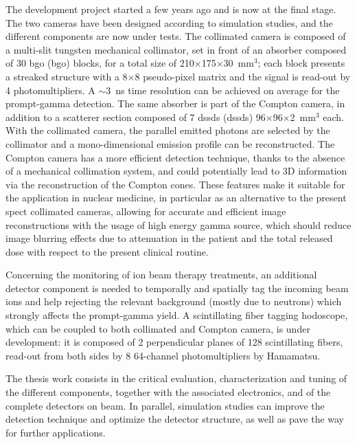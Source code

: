 The development project started a few years ago and is now at the final stage. The two cameras have been designed according to simulation studies, and the different components are now under tests.
The collimated camera is composed of a multi-slit tungsten mechanical collimator, set in front of an absorber composed of 30 \glsdesc{bgo} (\gls{bgo}) blocks, for a total size of 210$\times$175$\times$30~mm$^{3}$; each block presents a streaked structure with a 8$\times$8 pseudo-pixel matrix and the signal is read-out by 4 photomultipliers. A $\sim$3~ns time resolution can be achieved on average for the prompt-gamma detection. The same absorber is part of the Compton camera, in addition to a scatterer section composed of 7 \glsdesc{dssd}s (\glspl{dssd}) 96$\times$96$\times$2~mm$^{3}$ each.
With the collimated camera, the parallel emitted photons are selected by the collimator and a mono-dimensional emission profile can be reconstructed. The Compton camera has a more efficient detection technique, thanks to the absence of a mechanical collimation system, and could potentially lead to 3D information via the reconstruction of the Compton cones. These features make it suitable for the application in nuclear medicine, in particular as an alternative to the present \gls{spect} collimated cameras, allowing for accurate and efficient image reconstructions with the usage of high energy gamma source, which should reduce image blurring effects due to attenuation in the patient and the total released dose with respect to the present clinical routine.
 
Concerning the monitoring of ion beam therapy treatments, an additional detector component is needed to temporally and spatially tag the incoming beam ions and help rejecting the relevant background (mostly due to neutrons) which strongly affects the prompt-gamma yield. A scintillating fiber tagging hodoscope, which can be coupled to both collimated and Compton camera, is under development: it is composed of 2 perpendicular planes of 128 scintillating fibers, read-out from both sides by 8 64-channel photomultipliers by Hamamatsu.
 
The thesis work consists in the critical evaluation, characterization and tuning of the different components, together with the associated electronics, and of the complete detectors on beam. In parallel, simulation studies can improve the detection technique and optimize the detector structure, as well as pave the way for further applications.

